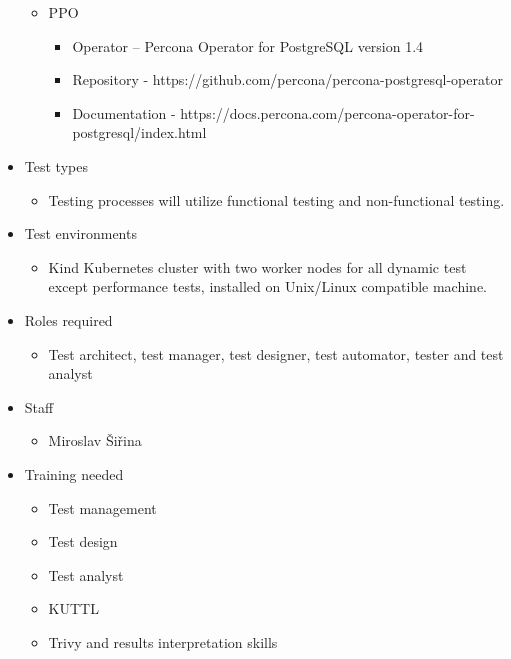 \begin{itemize}
\begin{itemize}
              \item PPO
                    \begin{itemize}
                        \item Operator – Percona Operator for PostgreSQL version 1.4
                        \item Repository -  https://github.com/percona/percona-postgresql-operator
                        \item Documentation - https://docs.percona.com/percona-operator-for-postgresql/index.html
                    \end{itemize}
          \end{itemize}

    \item Test types
          \begin{itemize}
              \item Testing processes will utilize functional testing and non-functional testing.
          \end{itemize}

    \item Test environments
          \begin{itemize}
              \item Kind Kubernetes cluster with two worker nodes for all dynamic test except performance tests, installed on Unix/Linux compatible machine.
          \end{itemize}

    \item Roles required
          \begin{itemize}
              \item Test architect, test manager, test designer, test automator, tester and test analyst
          \end{itemize}

    \item Staff
          \begin{itemize}
              \item Miroslav Šiřina
          \end{itemize}

    \item Training needed
          \begin{itemize}
              \item	Test management
              \item	Test design
              \item	Test analyst
              \item	KUTTL
              \item	Trivy and results interpretation skills
          \end{itemize}


\end{itemize}
